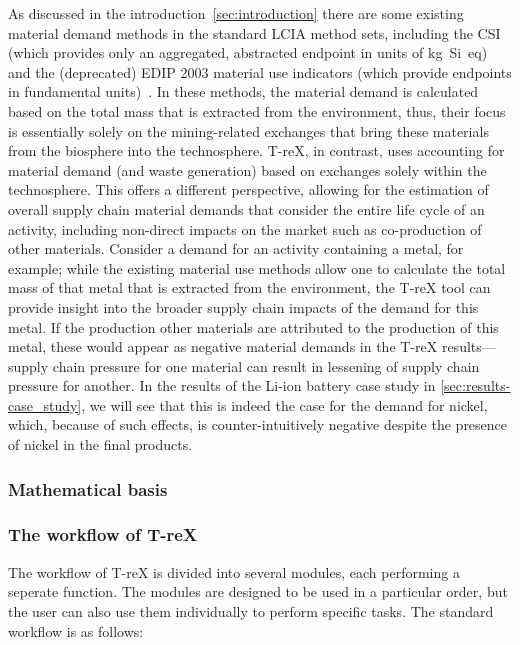 As discussed in the introduction~\ref{sec:introduction} there are some existing material demand methods in the standard LCIA method sets, including the CSI (which provides only an aggregated, abstracted endpoint in units of kg~Si~eq)~\citep{arvidsson2020csi} and the (deprecated) EDIP 2003 material use indicators (which provide endpoints in fundamental units)~\citep{hauschild2003edip}. In these methods, the material demand is calculated based on the total mass that is extracted from the environment, thus, their focus is essentially solely on the mining-related exchanges that bring these materials from the biosphere into the technosphere. T-reX, in contrast, uses accounting for material demand (and waste generation) based on exchanges solely within the technosphere. This offers a different perspective, allowing for the estimation of overall supply chain material demands that consider the entire life cycle of an activity, including non-direct impacts on the market such as co-production of other materials. Consider a demand for an activity containing a metal, for example; while the existing material use methods allow one to calculate the total mass of that metal that is extracted from the environment, the T-reX tool can provide insight into the broader supply chain impacts of the demand for this metal. If the production other materials are attributed to the production of this metal, these would appear as negative material demands in the T-reX results---supply chain pressure for one material can result in lessening of supply chain pressure for another. In the results of the Li-ion battery case study in \autoref{sec:results-case_study}, we will see that this is indeed the case for the demand for nickel, which, because of such effects, is counter-intuitively negative despite the presence of nickel in the final products.

\subsubsection{Mathematical basis}


\subsubsection{The workflow of T-reX}

The workflow of T-reX is divided into several modules, each performing a seperate function. The modules are designed to be used in a particular order, but the user can also use them individually to perform specific tasks. The standard workflow is as follows:

